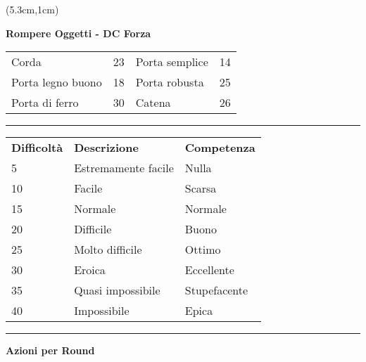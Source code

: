 \documentclass[a4paper,12 pt,openany]{book}
\newcommand{\riga}{\rule{\textwidth}{0.4pt}}
\begin{document}
\begin{textblock*}{8.3cm}(5.3cm,1cm)

\textbf{Rompere Oggetti - DC Forza}\\
\begin{tabular}{ll|ll}
Corda   		   & 23&	Porta semplice         & 14\\
Porta legno buono  & 18&	Porta robusta          & 25\\
Porta di ferro     & 30&	Catena                 & 26 \\
\end{tabular}

\riga

\begin{tabular}{lll}
\textbf{Difficoltà} & \textbf{Descrizione} & \textbf{Competenza} \\
5 & Estremamente facile  & Nulla\\
10  & Facile & Scarsa\\
15  & Normale  & Normale\\
20  & Difficile  & Buono\\
25  & Molto difficile  & Ottimo\\
30  & Eroica  	 & Eccellente\\
35  & Quasi impossibile & Stupefacente\\
40  & Impossibile  & Epica\\
\end{tabular}

\riga

\textbf{Azioni per Round} 


\end{textblock*}
\end{document}
